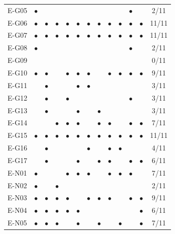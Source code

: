 \begin{longtable}{lccccccccccc c}
    E-G05 & $\bullet$ &  &  &  &  &  &  &  &  & $\bullet$ &  & 2/11 \\
    E-G06 & $\bullet$ & $\bullet$ & $\bullet$ & $\bullet$ & $\bullet$ & $\bullet$ & $\bullet$ & $\bullet$ & $\bullet$ & $\bullet$ & $\bullet$ & 11/11 \\
    E-G07 & $\bullet$ & $\bullet$ & $\bullet$ & $\bullet$ & $\bullet$ & $\bullet$ & $\bullet$ & $\bullet$ & $\bullet$ & $\bullet$ & $\bullet$ & 11/11 \\
    E-G08 & $\bullet$ &  &  &  &  &  &  &  &  & $\bullet$ &  & 2/11 \\
    E-G09 &  &  &  &  &  &  &  &  &  &  &  & 0/11 \\
    E-G10 & $\bullet$ & $\bullet$ &  & $\bullet$ & $\bullet$ & $\bullet$ &  & $\bullet$ & $\bullet$ & $\bullet$ & $\bullet$ & 9/11 \\
    E-G11 &  & $\bullet$ &  &  & $\bullet$ & $\bullet$ &  &  &  &  &  & 3/11 \\
    E-G12 &  & $\bullet$ &  & $\bullet$ &  &  &  &  &  & $\bullet$ &  & 3/11 \\
    E-G13 &  & $\bullet$ &  &  & $\bullet$ &  & $\bullet$ &  &  &  &  & 3/11 \\
    E-G14 &  &  & $\bullet$ & $\bullet$ & $\bullet$ &  & $\bullet$ & $\bullet$ &  & $\bullet$ & $\bullet$ & 7/11 \\
    E-G15 & $\bullet$ & $\bullet$ & $\bullet$ & $\bullet$ & $\bullet$ & $\bullet$ & $\bullet$ & $\bullet$ & $\bullet$ & $\bullet$ & $\bullet$ & 11/11 \\
    E-G16 &  & $\bullet$ &  &  &  & $\bullet$ &  & $\bullet$ & $\bullet$ &  &  & 4/11 \\
    E-G17 &  & $\bullet$ &  &  & $\bullet$ &  & $\bullet$ & $\bullet$ &  & $\bullet$ & $\bullet$ & 6/11 \\
    E-N01 & $\bullet$ &  &  & $\bullet$ & $\bullet$ & $\bullet$ &  & $\bullet$ & $\bullet$ & $\bullet$ &  & 7/11 \\
    E-N02 & $\bullet$ &  & $\bullet$ &  &  &  &  &  &  &  &  & 2/11 \\
    E-N03 & $\bullet$ & $\bullet$ & $\bullet$ & $\bullet$ &  & $\bullet$ & $\bullet$ & $\bullet$ &  & $\bullet$ & $\bullet$ & 9/11 \\
    E-N04 & $\bullet$ & $\bullet$ & $\bullet$ & $\bullet$ & $\bullet$ &  &  &  &  &  & $\bullet$ & 6/11 \\
    E-N05 & $\bullet$ & $\bullet$ & $\bullet$ &  & $\bullet$ &  & $\bullet$ &  & $\bullet$ &  & $\bullet$ & 7/11 \\

\end{longtable}
